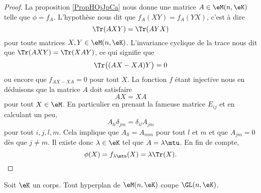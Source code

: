 \begin{proof}
    La proposition \ref{PropHOjJpCa} nous donne une matrice \( A\in \eM(n,\eK)\) telle que \( \phi=f_A\). L'hypothèse nous dit que \( f_A(XY)=f_A(YX)\), c'est à dire
    \begin{equation}
        \Tr(AXY)=\Tr(AYX)
    \end{equation}
    pour toute matrices \( X,Y\in \eM(n,\eK)\). L'invariance cyclique de la trace nous dit que \( \Tr(AXY)=\Tr(XAY)\), ce qui signifie que
    \begin{equation}
        \Tr\big( (AX-XA)Y \big)=0
    \end{equation}
    ou encore que \( f_{AX-XA}=0\) pour tout \( X\). La fonction \( f\) étant injective nous en déduisons que la matrice \( A\) doit satisfaire
    \begin{equation}
        AX=XA
    \end{equation}
    pour tout \( X\in\eM\). En particulier en prenant la fameuse matrice \( E_{ij}\) et en calculant un peu,
    \begin{equation}
        A_{li}\delta_{jm}=\delta_{il}A_{jm}
    \end{equation}
    pour tout \( i,j,l,m\). Cela implique que \( A_{ll}=A_{mm}\) pour tout \( l\) et \( m\) et que \( A_{jm}=0\) dès que \( j\neq m\). Il existe donc \( \lambda\in \eK\) tel que \( A=\lambda\mtu\). En fin de compte,
    \begin{equation}
        \phi(X)=f_{\lambda\mtu}(X)=\lambda\Tr(X).
    \end{equation}
\end{proof}

\begin{corollary}       \label{CorICUOooPsZQrg}
    Soit \( \eK\) un corps. Tout hyperplan de \( \eM(n,\eK)\) coupe \( \GL(n,\eK)\).
\end{corollary}

